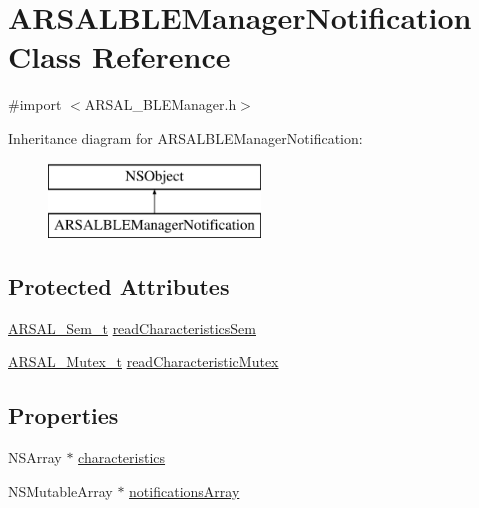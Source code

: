 \hypertarget{interfaceARSALBLEManagerNotification}{}\section{A\+R\+S\+A\+L\+B\+L\+E\+Manager\+Notification Class Reference}
\label{interfaceARSALBLEManagerNotification}


{\ttfamily \#import $<$A\+R\+S\+A\+L\+\_\+\+B\+L\+E\+Manager.\+h$>$}

Inheritance diagram for A\+R\+S\+A\+L\+B\+L\+E\+Manager\+Notification\+:\begin{figure}[H]
\begin{center}
\leavevmode
\includegraphics[height=2.000000cm]{interfaceARSALBLEManagerNotification}
\end{center}
\end{figure}
\subsection*{Protected Attributes}
\begin{DoxyCompactItemize}
\item 
\hyperlink{ARSAL__Sem_8h_a74eaf25f9acaab7ff185cb3c30ffda1c}{A\+R\+S\+A\+L\+\_\+\+Sem\+\_\+t} \hyperlink{interfaceARSALBLEManagerNotification_a3aee56e9a10b2d50f2302ab6470bd355}{read\+Characteristics\+Sem}
\item 
\hyperlink{ARSAL__Mutex_8h_a6ad002456ab5e96d6bd51a0df06f0f57}{A\+R\+S\+A\+L\+\_\+\+Mutex\+\_\+t} \hyperlink{interfaceARSALBLEManagerNotification_a687c5dd539262acf0b31ab485dcb885d}{read\+Characteristic\+Mutex}
\end{DoxyCompactItemize}
\subsection*{Properties}
\begin{DoxyCompactItemize}
\item 
N\+S\+Array $\ast$ \hyperlink{interfaceARSALBLEManagerNotification_a8f917b047e82a91e94467bfe22f35ff4}{characteristics}
\item 
N\+S\+Mutable\+Array $\ast$ \hyperlink{interfaceARSALBLEManagerNotification_a8584e955f261031e6e713dbe7d1a1879}{notifications\+Array}
\end{DoxyCompactItemize}


